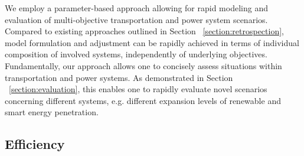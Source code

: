 

We employ a parameter-based approach allowing for rapid modeling and evaluation of multi-objective transportation and power system scenarios. Compared to existing approaches outlined in Section ~\ref{section:retrospection}, model formulation and adjustment can be rapidly achieved in terms of individual composition of involved systems, independently of underlying objectives. Fundamentally, our approach allows one to concisely assess situations within transportation and power systems. As demonstrated in Section ~\ref{section:evaluation}, this enables one to rapidly evaluate novel scenarios concerning different systems, e.g. different expansion levels of renewable and smart energy penetration. 

\subsection{Efficiency}

